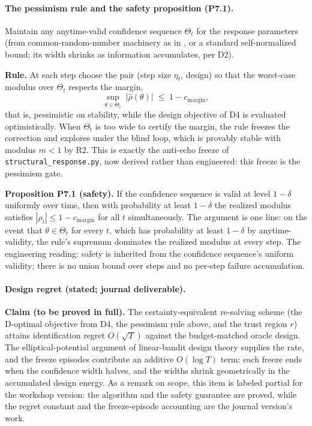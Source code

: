 \paragraph{The pessimism rule and the safety proposition (P7.1).}
Maintain any anytime-valid confidence sequence $\Theta_t$ for the response
parameters (from common-random-number machinery as in \citet{reflex2026},
or a standard self-normalized bound; its width shrinks as information accumulates, per
D2).

\textbf{Rule.} At each step choose the pair (step size $\eta_t$, design)
so that the worst-case modulus over $\Theta_t$ respects the margin,
\begin{equation*}
\sup_{\theta \in \Theta_t}\; \big|\hat\rho(\theta)\big|
\;\le\; 1 - c_{\mathrm{margin}} ,
\end{equation*}
that is, pessimistic on stability, while the design objective of D4 is
evaluated optimistically. When $\Theta_t$ is too wide to certify the
margin, the rule freezes the correction and explores under the blind loop,
which is provably stable with modulus $m<1$ by R2. This is exactly the
anti-echo freeze of \texttt{structural\_response.py}, now derived rather
than engineered: this freeze is the pessimism gate.

\textbf{Proposition P7.1 (safety).} If the confidence sequence is valid
at level $1-\delta$ uniformly over time, then with probability at least
$1-\delta$ the realized modulus satisfies
$|\rho_t| \le 1 - c_{\mathrm{margin}}$ for all $t$ simultaneously. The
argument is one line: on the event that $\theta \in \Theta_t$ for every
$t$, which has probability at least $1-\delta$ by anytime-validity, the
rule's supremum dominates the realized modulus at every step. The
engineering reading: safety is inherited from the confidence sequence's
uniform validity; there is no union bound over steps and no per-step
failure accumulation.

\paragraph{Design regret (stated; journal deliverable).}
\textbf{Claim (to be proved in full).} The certainty-equivalent
re-solving scheme (the D-optimal objective from D4, the pessimism rule
above, and the trust region $r$) attains identification regret
$O(\sqrt{T})$ against the budget-matched oracle design. The
elliptical-potential argument of linear-bandit design theory supplies the
rate, and the freeze episodes contribute an additive $O(\log T)$ term:
each freeze ends when the confidence width halves, and the widths shrink
geometrically in the accumulated design energy. As a remark on scope,
this item is labeled partial for the workshop version: the algorithm and
the safety guarantee are proved, while the regret constant and the
freeze-episode accounting are the journal version's work.

